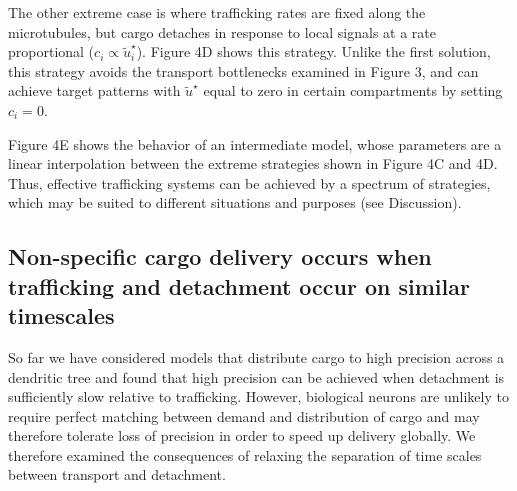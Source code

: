 \documentclass[11pt]{wlpeerj}
\begin{document}
The other extreme case is where trafficking rates are fixed along the microtubules, but cargo detaches in response to local signals at a rate proportional ($c_i \propto \tilde{u}^\star_i$). Figure 4D shows this strategy. Unlike the first solution, this strategy avoids the transport bottlenecks examined in Figure 3, and can achieve target patterns with  $\tilde{u}^\star$ equal to zero in certain compartments by setting $c_i = 0$. 

Figure 4E shows the behavior of an intermediate model, whose parameters are a linear interpolation between the extreme strategies shown in Figure 4C and 4D.
Thus, effective trafficking systems can be achieved by a spectrum of strategies, which may be suited to different situations and purposes (see Discussion). 

\subsection*{Non-specific cargo delivery occurs when trafficking and detachment occur on similar timescales}

So far we have considered models that distribute cargo to high precision across a dendritic tree and found that high precision can be achieved when detachment is sufficiently slow relative to trafficking. However, biological neurons are unlikely to require perfect matching between demand and distribution of cargo and may therefore tolerate loss of precision in order to speed up delivery globally.
We therefore examined the consequences of relaxing the separation of time scales between transport and detachment.
\end{document}
